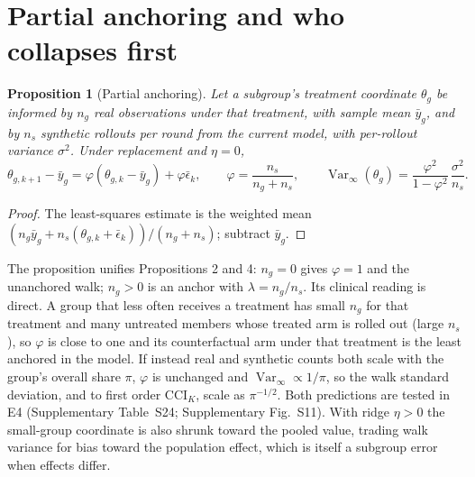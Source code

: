 \documentclass[11pt,a4paper]{article}
\newcommand{\Var}{\operatorname{Var}}
\newcommand{\CCI}{\mathrm{CCI}}
\newtheorem{proposition}{Proposition}[section]
\begin{document}
\section{Partial anchoring and who collapses first}
\begin{proposition}[Partial anchoring]
Let a subgroup's treatment coordinate $\theta_g$ be informed by $n_g$ real observations under that treatment, with sample mean $\bar y_g$, and by $n_s$ synthetic rollouts per round from the current model, with per-rollout variance $\sigma^2$. Under replacement and $\eta=0$,
\begin{equation}
\theta_{g,k+1}-\bar y_g=\varphi(\theta_{g,k}-\bar y_g)+\varphi\bar\epsilon_k,\qquad \varphi=\frac{n_s}{n_g+n_s},\qquad \Var_\infty(\theta_g)=\frac{\varphi^2}{1-\varphi^2}\,\frac{\sigma^2}{n_s}.
\end{equation}
\end{proposition}
\begin{proof}
The least-squares estimate is the weighted mean $(n_g\bar y_g+n_s(\theta_{g,k}+\bar\epsilon_k))/(n_g+n_s)$; subtract $\bar y_g$.
\end{proof}
The proposition unifies Propositions 2 and 4: $n_g=0$ gives $\varphi=1$ and the unanchored walk; $n_g>0$ is an anchor with $\lambda=n_g/n_s$. Its clinical reading is direct. A group that less often receives a treatment has small $n_g$ for that treatment and many untreated members whose treated arm is rolled out (large $n_s$), so $\varphi$ is close to one and its counterfactual arm under that treatment is the least anchored in the model. If instead real and synthetic counts both scale with the group's overall share $\pi$, $\varphi$ is unchanged and $\Var_\infty\propto1/\pi$, so the walk standard deviation, and to first order $\CCI_K$, scale as $\pi^{-1/2}$. Both predictions are tested in E4 (Supplementary Table~S24; Supplementary Fig.~S11). With ridge $\eta>0$ the small-group coordinate is also shrunk toward the pooled value, trading walk variance for bias toward the population effect, which is itself a subgroup error when effects differ.
\end{document}
